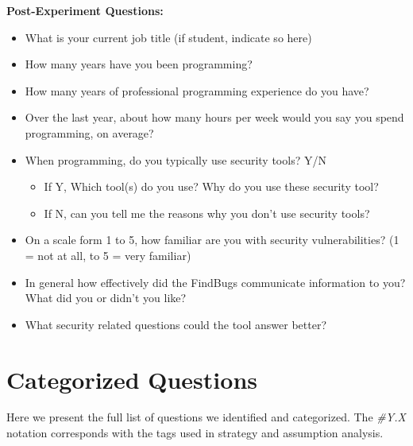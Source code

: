 \documentclass[10pt,journal,compsoc]{IEEEtran}
\begin{document}
\textbf{Post-Experiment Questions:}
\begin{itemize}
\item What is your current job title (if student, indicate so here)
\item How many years have you been programming?
\item How many years of professional programming experience do you have?
\item Over the last year, about how many hours per week would you say you spend programming, on
average?
\item When programming, do you typically use security tools? Y/N
\begin{itemize}
	\item If Y, Which tool(s) do you use? Why do you use these security tool?
	\item If N, can you tell me the reasons why you don't use security tools?
\end{itemize}
\item On a scale form 1 to 5, how familiar are you with security vulnerabilities?
(1 = not at all, to 5 = very familiar)
\item In general how effectively did the FindBugs communicate information to you? What did you or didn't you like?
\item What security related questions could the tool answer better?
\end{itemize}

\section*{Categorized Questions}
Here we present the full list of questions we identified and categorized. 
The \textit{\#Y.X} notation corresponds with the tags used in strategy and assumption analysis.
\end{document}
